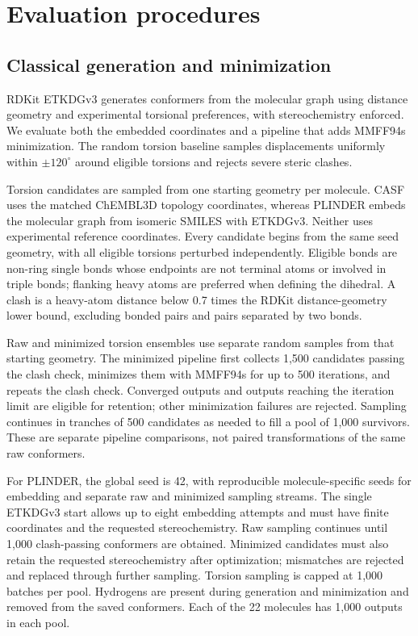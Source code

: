 \section*{Evaluation procedures}

\subsection*{Classical generation and minimization}

RDKit ETKDGv3\cite{wang2020etkdg} generates conformers from the molecular graph using distance
geometry and experimental torsional preferences, with stereochemistry enforced. We evaluate
both the embedded coordinates and a pipeline that adds MMFF94s\cite{halgren1999mmff94s}
minimization. The random torsion baseline samples displacements uniformly within
$\pm120^\circ$ around eligible torsions and rejects severe steric clashes.

Torsion candidates are sampled from one starting geometry per molecule. CASF uses the
matched ChEMBL3D topology coordinates, whereas PLINDER embeds the molecular graph
from isomeric SMILES with ETKDGv3. Neither uses experimental reference coordinates.
Every candidate begins from the same seed geometry, with all eligible torsions
perturbed independently. Eligible bonds are non-ring single bonds whose endpoints
are not terminal atoms or involved in triple bonds; flanking heavy atoms are preferred
when defining the dihedral. A clash is a heavy-atom distance below 0.7 times the RDKit
distance-geometry lower bound, excluding bonded pairs and pairs separated by two bonds.

Raw and minimized torsion ensembles use separate random samples from that starting
geometry. The minimized pipeline first collects 1,500 candidates passing the clash
check, minimizes them with MMFF94s for up to 500 iterations, and repeats the clash check.
Converged outputs and outputs reaching the iteration limit are eligible for retention;
other minimization failures are rejected. Sampling continues in tranches of 500 candidates
as needed to fill a pool of 1,000 survivors. These are separate pipeline comparisons,
not paired transformations of the same raw conformers.

For PLINDER, the global seed is 42, with reproducible molecule-specific seeds for
embedding and separate raw and minimized sampling streams. The single ETKDGv3 start
allows up to eight embedding attempts and must have finite coordinates and the requested
stereochemistry. Raw sampling continues until 1,000 clash-passing conformers are obtained.
Minimized candidates must also retain the requested stereochemistry after optimization;
mismatches are rejected and replaced through further sampling. Torsion sampling is capped
at 1,000 batches per pool. Hydrogens are present during generation and minimization and
removed from the saved conformers. Each of the 22 molecules has 1,000 outputs in each pool.

